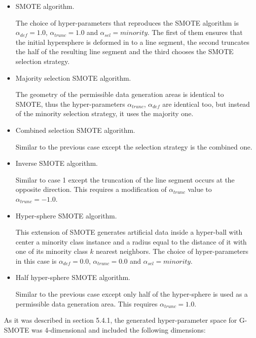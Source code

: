 \documentclass[parskip=full]{scrartcl}
\begin{document}
\begin{itemize}
	
	\renewcommand\labelitemi{--}

	\item SMOTE algorithm.

	The choice of hyper-parameters that reproduces the SMOTE algorithm is \( \alpha_{def} = 1.0 \), \( \alpha_{trunc} = 1.0 \) and \( \alpha_{sel} = minority \). The first of them ensures that the initial hypersphere is deformed in to a line segment, the second truncates the half of the resulting line segment and the third chooses the SMOTE selection strategy.

	\item Majority selection SMOTE algorithm.

	The geometry of the permissible data generation areas is identical to SMOTE, thus the hyper-parameters \( \alpha_{trunc} \), \( \alpha_{def} \) are identical too, but instead of the minority selection strategy, it uses the majority one.

	\item Combined selection SMOTE algorithm.

	Similar to the previous case except the selection strategy is the combined one.

	\item Inverse SMOTE algorithm.

	Similar to case 1 except the truncation of the line segment occurs at the opposite direction. This requires a modification of \( \alpha_{trunc} \) value to \( \alpha_{trunc} = -1.0 \).

	\item Hyper-sphere SMOTE algorithm.

	This extension of SMOTE generates artificial data inside a hyper-ball with center a minority class instance and a radius equal to the distance of it with one of its minority class \( k \) nearest neighbors. The choice of hyper-parameters in this case is \( \alpha_{def} = 0.0 \), \( \alpha_{trunc} = 0.0 \) and \( \alpha_{sel} = minority \).

	\item Half hyper-sphere SMOTE algorithm.

	Similar to the previous case except only half of the hyper-sphere is used as a permissible data generation area. This requires \( \alpha_{trunc} = 1.0 \).

\end{itemize}

As it was described in section 5.4.1, the generated hyper-parameter space for G-SMOTE was 4-dimensional and included the following dimensions:
\end{document}
